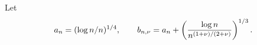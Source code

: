 Let
\[
 a_n=(\log n/n)^{1/4},\qquad
 b_{n,\nu}=a_n+\left({\log n\over n^{(1+\nu)/(2+\nu)}}\right)^{1/3}.
\]